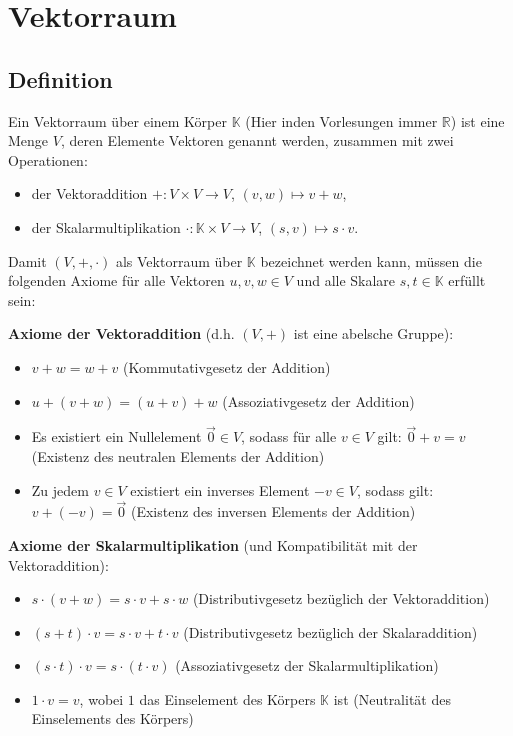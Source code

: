 \chapter{Vektorraum}

\section{Definition}

Ein Vektorraum über einem Körper $\mathbb{K}$ (Hier inden Vorlesungen immer
$\mathbb{R}$) ist eine Menge $V$, deren Elemente Vektoren genannt werden,
zusammen mit zwei Operationen:
\begin{itemize}
    \item der Vektoraddition $+ : V \times V \to V$, $(v, w) \mapsto v+w$,
    \item der Skalarmultiplikation $\cdot : \mathbb{K} \times V \to V$, $(s, v) \mapsto s
              \cdot v$.
\end{itemize}

Damit $(V, +, \cdot)$ als Vektorraum über $\mathbb{K}$ bezeichnet werden kann,
müssen die folgenden Axiome für alle Vektoren $u, v, w \in V$ und alle Skalare
$s, t \in \mathbb{K}$ erfüllt sein:

\textbf{Axiome der Vektoraddition} (d.h. $(V,+)$ ist eine abelsche Gruppe):
\begin{itemize}
    \item $v + w = w + v$ (Kommutativgesetz der Addition)
    \item $u + (v + w) = (u + v) + w$ (Assoziativgesetz der Addition)
    \item Es existiert ein Nullelement $\vec{0} \in V$, sodass für alle $v \in V$ gilt:
          $\vec{0} + v = v$ (Existenz des neutralen Elements der Addition)
    \item Zu jedem $v \in V$ existiert ein inverses Element $-v \in V$, sodass gilt: $v +
              (-v) = \vec{0}$ (Existenz des inversen Elements der Addition)
\end{itemize}

\textbf{Axiome der Skalarmultiplikation} (und Kompatibilität mit der Vektoraddition):
\begin{itemize}
    \item $s \cdot (v + w) = s \cdot v + s \cdot w$ (Distributivgesetz bezüglich der Vektoraddition)
    \item $(s + t) \cdot v = s \cdot v + t \cdot v$ (Distributivgesetz bezüglich der Skalaraddition)
    \item $(s \cdot t) \cdot v = s \cdot (t \cdot v)$ (Assoziativgesetz der Skalarmultiplikation)
    \item $1 \cdot v = v$, wobei $1$ das Einselement des Körpers $\mathbb{K}$ ist (Neutralität des Einselements des Körpers)
\end{itemize}

